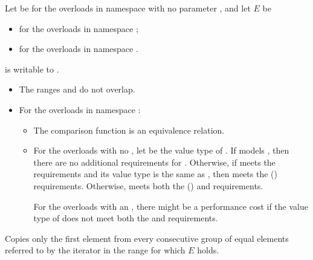 \begin{itemdescr}
\pnum
Let  be  for the overloads
in namespace  with no parameter , and
let $E$ be
\begin{itemize}
\setlength{\emergencystretch}{1em}
\item
  for the overloads in namespace ;
\item
  for the overloads in namespace .
\end{itemize}

\pnum
\mandates
{} is writable to .

\pnum
\expects
\begin{itemize}
\item
  The ranges  and 
  do not overlap.
\item
  For the overloads in namespace :
  \begin{itemize}
  \item
    The comparison function is an equivalence relation.
  \item
    For the overloads with no ,
    let  be the value type of .
    If  models
    ,
    then there are no additional requirements for .
    Otherwise, if  meets
    the  requirements and
    its value type is the same as ,
    then  meets
    the  () requirements.
    Otherwise,  meets both
    the  () and
     requirements.
    \begin{note}
    For the overloads with an ,
    there might be a performance cost
    if the value type of  does not meet both the
     and  requirements.
    \end{note}
  \end{itemize}
\end{itemize}

\pnum
\effects
Copies only the first element from every consecutive group of equal elements
referred to by the iterator  in the range 
for which $E$ holds.


\end{itemdescr}
